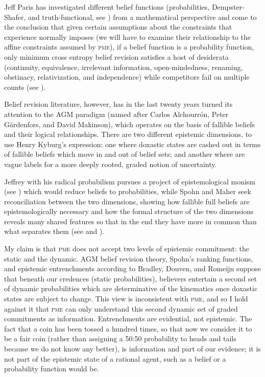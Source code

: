 \documentclass[phd,12pt,oneside]{ubcthesis}
\begin{document}
Jeff Paris has investigated different belief functions (probabilities,
Dempster-Shafer, and truth-functional, see ) from
a mathematical perspective and come to the conclusion that given
certain assumptions about the constraints that experience normally
imposes (we will have to examine their relationship to the affine
constraints assumed by \textsc{pme}), if a belief function is a
probability function, only minimum cross entropy belief revision
satisfies a host of desiderata (continuity, equivalence, irrelevant
information, open-mindedness, renaming, obstinacy, relativization, and
independence) while competitors fail on multiple counts (see
).

Belief revision literature, however, has in the last twenty years
turned its attention to the AGM paradigm (named after Carlos
Alchourr{\'o}n, Peter G{\"a}rdenfors, and David Makinson), which
operates on the basis of fallible beliefs and their logical
relationships. There are two different epistemic dimensions, to use
Henry Kyburg's expression: one where doxastic states are cashed out in
terms of fallible beliefs which move in and out of belief sets; and
another where  are vague labels for a more deeply
rooted, graded notion of uncertainty.

Jeffrey with his radical probabilism pursues a project of
epistemological monism (see ) which would reduce
beliefs to probabilities, while Spohn and Maher seek reconciliation
between the two dimensions, showing how fallible full beliefs are
epistemologically necessary and how the formal structure of the two
dimensions reveals many shared features so that in the end they have
more in common than what separates them (see 
and ).

My claim is that \textsc{pme} does not accept two levels of
epistemic commitment: the static and the dynamic. AGM belief revision
theory, Spohn's ranking functions, and epistemic entrenchments
according to Bradley, Douven, and Romeijn suppose that beneath our
credences (static probabilities), believers entertain a second set of
dynamic probabilities which are determinative of the kinematics once
doxastic states are subject to change. This view is inconsistent with
\textsc{pme}, and so I hold against it that \textsc{pme} can
only understand this second dynamic set of graded commitments as
information. Entrenchments are evidential, not epistemic. The fact
that a coin has been tossed a hundred times, so that now we consider
it to be a fair coin (rather than assigning a 50:50 probability to
heads and tails because we do not know any better), is information and
part of our evidence; it is not part of the epistemic state of a
rational agent, such as a belief or a probability function would be.
\end{document}
